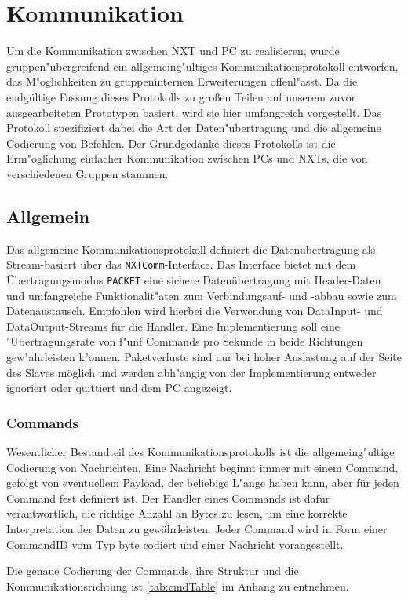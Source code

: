 \documentclass[oneside,abstractoff,a4paper]{scrartcl}
\begin{document}
\section{Kommunikation}
Um die Kommunikation zwischen NXT und PC zu realisieren, wurde gruppen"ubergreifend ein allgemeing"ultiges Kommunikationsprotokoll entworfen, das M"oglichkeiten zu gruppeninternen Erweiterungen offenl"asst. Da die endgültige Fassung dieses Protokolls zu großen Teilen auf unserem zuvor ausgearbeiteten Prototypen basiert, wird sie hier umfangreich vorgestellt. Das Protokoll spezifiziert dabei die Art der Daten"ubertragung und die allgemeine Codierung von Befehlen. Der Grundgedanke dieses Protokolls ist die Erm"oglichung einfacher Kommunikation zwischen PCs und NXTs, die von verschiedenen Gruppen stammen.

\subsection{Allgemein}
Das allgemeine Kommunikationsprotokoll definiert die Datenübertragung als Stream-basiert über das \texttt{NXTComm}-Interface. Das Interface bietet mit dem Übertragungsmodus \texttt{PACKET} eine sichere Datenübertragung mit Header-Daten und umfangreiche Funktionalit"aten zum Verbindungsauf- und -abbau sowie zum Datenaustausch. Empfohlen wird hierbei die Verwendung von DataInput- und DataOutput-Streams für die Handler. Eine Implementierung soll eine "Ubertragungsrate von f"unf Commands pro Sekunde in beide Richtungen gew"ahrleisten k"onnen. Paketverluste sind nur bei hoher Auslastung auf der Seite des Slaves möglich und werden abh"angig von der Implementierung entweder ignoriert oder quittiert und dem PC angezeigt.

\subsubsection{Commands}
Wesentlicher Bestandteil des Kommunikationsprotokolls ist die allgemeing"ultige Codierung von Nachrichten. Eine Nachricht beginnt immer mit einem Command, gefolgt von eventuellem Payload, der beliebige L"ange haben kann, aber für jeden Command fest definiert ist. Der Handler eines Commands ist dafür verantwortlich, die richtige Anzahl an Bytes zu lesen, um eine korrekte Interpretation der Daten zu gewährleisten. Jeder Command wird in Form einer CommandID vom Typ byte codiert und einer Nachricht vorangestellt.

Die genaue Codierung der Commands, ihre Struktur und die Kommunikationsrichtung ist \cref{tab:cmdTable} im Anhang zu entnehmen.\\  
\end{document}
